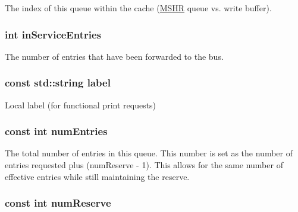\label{classMSHRQueue_a32b76ccceab9e1bba3e8c4ef2947d1d8}
The index of this queue within the cache (\hyperlink{classMSHR}{MSHR} queue vs. write buffer). \hypertarget{classMSHRQueue_aa4871243af391ed1f0d5e3f964bc13d0}{
\subsubsection[{inServiceEntries}]{\setlength{\rightskip}{0pt plus 5cm}int {\bf inServiceEntries}}}
\label{classMSHRQueue_aa4871243af391ed1f0d5e3f964bc13d0}
The number of entries that have been forwarded to the bus. \hypertarget{classMSHRQueue_ae471a4c4073716b769170188214fe93d}{
\subsubsection[{label}]{\setlength{\rightskip}{0pt plus 5cm}const std::string {\bf label}}}
\label{classMSHRQueue_ae471a4c4073716b769170188214fe93d}
Local label (for functional print requests) \hypertarget{classMSHRQueue_aac2a0fada965c3dd6220aeb40a28c587}{
\subsubsection[{numEntries}]{\setlength{\rightskip}{0pt plus 5cm}const int {\bf numEntries}}}
\label{classMSHRQueue_aac2a0fada965c3dd6220aeb40a28c587}
The total number of entries in this queue. This number is set as the number of entries requested plus (numReserve -\/ 1). This allows for the same number of effective entries while still maintaining the reserve. \hypertarget{classMSHRQueue_a2c97f85062902d3990c3a9c163306547}{
\subsubsection[{numReserve}]{\setlength{\rightskip}{0pt plus 5cm}const int {\bf numReserve}}}
